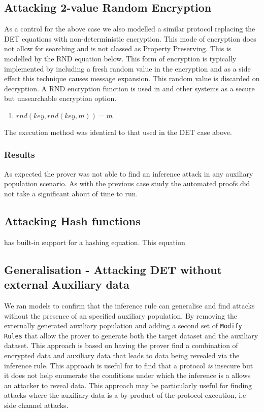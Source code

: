 \documentclass[journal]{IEEEtran}
\begin{document}
\subsection{Attacking 2-value Random Encryption}
As a control for the above case we also modelled a similar protocol replacing the DET equations with non-deterministic encryption.
This mode of encryption does not allow for searching and is not classed as Property Preserving. This is modelled by the RND equation below. This form of encryption is typically implemented by including a fresh random value in the encryption and as a side effect this technique causes message expansion. This random value is discarded on decryption. A RND encryption function is used in \cite{Popa2011} and other systems as a secure but unsearchable encryption option.
\begin{enumerate}
    \item $rnd(key, rnd(key, m))=m$
\end{enumerate}
The execution method was identical to that used in the DET case above.
\subsubsection{Results}
As expected the prover was not able to find an inference attack in any auxiliary population scenario. As with the previous case study the automated proofs did not take a significant about of time to run.

\subsection{Attacking Hash functions}
\tamarin{} has built-in support for a hashing equation. This equation 

\subsection{Generalisation - Attacking DET without external Auxiliary data}
We ran models to confirm that the inference rule can generalise and find attacks without the presence of an specified auxiliary population. By removing the externally generated auxiliary population and adding a second set of \texttt{Modify Rules} that allow the prover to generate both the target dataset and the auxiliary dataset. This approach is based on having the prover find a combination of encrypted data and auxiliary data that leads to data being revealed via the inference rule. This approach is useful for to find that a protocol \textit{is} insecure but it does not help enumerate the conditions under which the inference is a allows an attacker to reveal data. This approach may be particularly useful for finding attacks where the auxiliary data is a by-product of the  protocol execution, i.e side channel attacks.
\end{document}
